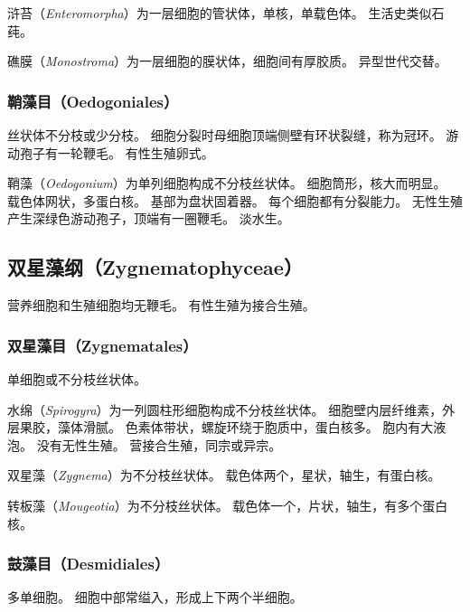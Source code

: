 \documentclass[11pt]{article}
\begin{document}
\par

浒苔（\textit{Enteromorpha}）为一层细胞的管状体，单核，单载色体。
生活史类似石莼。

\par

礁膜（\textit{Monostroma}）为一层细胞的膜状体，细胞间有厚胶质。
异型世代交替。

\subsubsection{鞘藻目（Oedogoniales）}
丝状体不分枝或少分枝。
细胞分裂时母细胞顶端侧壁有环状裂缝，称为冠环。
游动孢子有一轮鞭毛。
有性生殖卵式。

\par

鞘藻（\textit{Oedogonium}）为单列细胞构成不分枝丝状体。
细胞筒形，核大而明显。
载色体网状，多蛋白核。
基部为盘状固着器。
每个细胞都有分裂能力。
无性生殖产生深绿色游动孢子，顶端有一圈鞭毛。
淡水生。

\subsection{双星藻纲（Zygnematophyceae）}
营养细胞和生殖细胞均无鞭毛。
有性生殖为接合生殖。

\subsubsection{双星藻目（Zygnematales）}
单细胞或不分枝丝状体。

\par

水绵（\textit{Spirogyra}）为一列圆柱形细胞构成不分枝丝状体。
细胞壁内层纤维素，外层果胶，藻体滑腻。
色素体带状，螺旋环绕于胞质中，蛋白核多。
胞内有大液泡。
没有无性生殖。
营接合生殖，同宗或异宗。

\par

双星藻（\textit{Zygnema}）为不分枝丝状体。
载色体两个，星状，轴生，有蛋白核。

\par

转板藻（\textit{Mougeotia}）为不分枝丝状体。
载色体一个，片状，轴生，有多个蛋白核。

\subsubsection{鼓藻目（Desmidiales）}
多单细胞。
细胞中部常缢入，形成上下两个半细胞。
\end{document}
